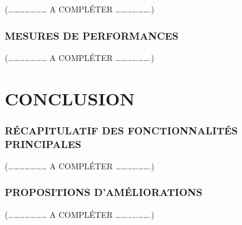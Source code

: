 \documentclass[a4paper]{article} %
\begin{document}
 

(………………… A COMPLÉTER ……………….)



\subsubsection{ MESURES DE PERFORMANCES }

(………………… A COMPLÉTER ……………….)

\section{CONCLUSION}
\subsubsection{RÉCAPITULATIF DES FONCTIONNALITÉS PRINCIPALES }

(………………… A COMPLÉTER ……………….)
\subsubsection{PROPOSITIONS D’AMÉLIORATIONS }

(………………… A COMPLÉTER ……………….)
\end{document}
